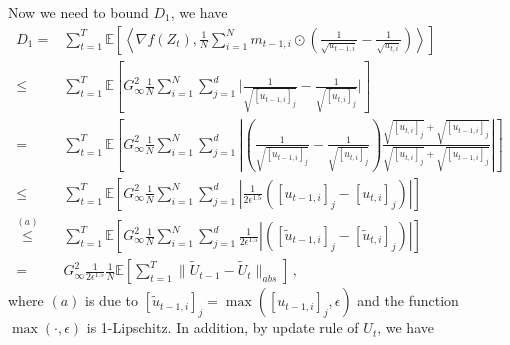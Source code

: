 \documentclass[anon,12pt]{colt2021} %
\begin{document}
Now we need to bound $D_1$, we have
\begin{align}\label{eq: T_1}
D_1 = & \sum_{t=1}^T   \mathbb E \left [\left \langle \nabla f( Z_{t}) , \frac{1}{N} \sum_{i=1}^N m_{t-1	,i} \odot (\frac{1}{\sqrt{u_{t-1,i}}} - \frac{1}{\sqrt{u_{t,i}}}) \right \rangle \right] \nonumber \\
\leq & \sum_{t=1}^T   \mathbb E \left [   G_{\infty}^2 \frac{1}{N} \sum_{i=1}^N \sum_{j=1}^d \bigg|\frac{1}{\sqrt{[u_{t-1,i}]_j}} - \frac{1}{\sqrt{[u_{t,i}]_j}}\bigg|   \right] \nonumber \\
= & \sum_{t=1}^T   \mathbb E \left [   G_{\infty}^2 \frac{1}{N} \sum_{i=1}^N \sum_{j=1}^d \left|\left(\frac{1}{\sqrt{[u_{t-1,i}]_j}} - \frac{1}{\sqrt{[u_{t,i}]_j}}\right) \frac{\sqrt{[u_{t,i}]_j}+\sqrt{[u_{t-1,i}]_j}}{\sqrt{[u_{t,i}]_j}+\sqrt{[u_{t-1,i}]_j}}\right|    \right] \nonumber \\
\leq & \sum_{t=1}^T   \mathbb E \left [   G_{\infty}^2 \frac{1}{N} \sum_{i=1}^N \sum_{j=1}^d \left|\frac{1}{2\epsilon^{1.5}}\left({{[u_{t-1,i}]_j}} - {{[u_{t,i}]_j}}\right) \right|    \right] \nonumber \\
\overset{(a)}{\leq} & \sum_{t=1}^T   \mathbb E \left [   G_{\infty}^2 \frac{1}{N} \sum_{i=1}^N \sum_{j=1}^d\frac{1}{2\epsilon^{1.5}} \left|\left({{[\tilde u_{t-1,i}]_j}} - {{[\tilde u_{t,i}]_j}}\right) \right|    \right] \nonumber \\
= &  G_{\infty}^2 \frac{1}{2\epsilon^{1.5}} \frac{1}{N}   \mathbb E \left [  \sum_{t=1}^T   \|{{\tilde U_{t-1}}} - {{\tilde U_{t}}\|_{abs}}    \right] \, ,  
\end{align}
where $(a)$ is due to $[\tilde u_{t-1,i}]_j = \max ([u_{t-1,i}]_j,\epsilon)$ and the function $\max(\cdot,\epsilon)$ is 1-Lipschitz.
In addition, by update rule of $U_t$, we have 
\end{document}
